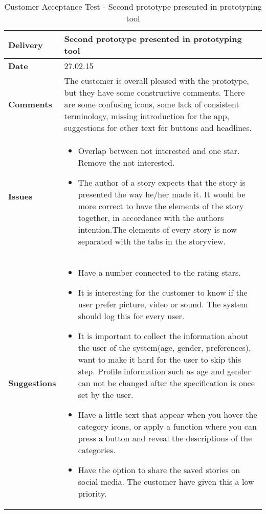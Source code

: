 \renewcommand{\arraystretch}{2}%
\begin{center}
	\begin{longtable}{ | p{4cm} | p{13cm} | }
		
		\caption[Customer Acceptance test]{Customer Acceptance Test - Second prototype presented in prototyping tool} \label{Tab:cattest2}\\
		\hline
		\textbf{Delivery} & Second prototype presented in prototyping tool\\ \hline
		\textbf{Date} & 27.02.15 \\ \hline 
		\textbf{Comments}&
		The customer is overall pleased with the prototype, but they have some constructive comments. 
		There are some confusing icons, some lack of consistent terminology, missing introduction for the app, suggestions for other text for buttons and headlines.
		\\ \hline
		\textbf{Issues} 	 &	 	 	 	
		\begin{itemize}[noitemsep]
			\item Overlap between not interested and one star. Remove the not interested.
			\item The author of a story expects that the story is presented the way he/her made it. It would be more correct to have the elements of the story together, in accordance with the authors intention.The elements of every story is now separated with the tabs in the storyview. 
		\end{itemize}
		\\ \hline
		\textbf{Suggestions} &
		\begin{itemize}[noitemsep]
			\item Have a number connected to the rating stars.
			\item It is interesting for the customer to know if the user prefer picture, video or sound. The system should log this for every user. 
			\item 	It is important to collect the information about the user of the system(age, gender, preferences), want to make it hard for the user to skip this step. Profile information such as age and gender can not be changed after the specification is once set by the user. 
			\item Have a little text that appear when you hover the category icons, or apply a function where you can press a button and reveal the descriptions of the categories. \newline
			\item Have the option to share the saved stories on social media. The customer have given this a low priority.
		\end{itemize}
		\\ \hline
	\end{longtable}
\end{center}


